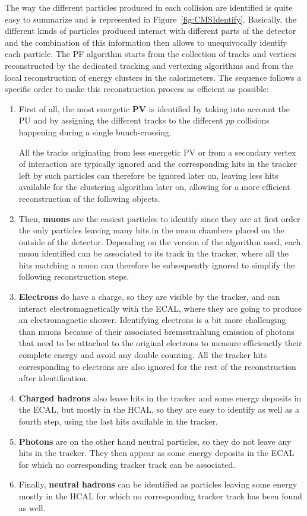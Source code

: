 \documentclass[a4paper, 10pt, openright]{report}
\begin{document}
The way the different particles produced in each collision are identified is quite easy to summarize and is represented in Figure~\ref{fig:CMSIdentify}. Basically, the different kinds of particles produced interact with different parts of the detector and the combination of this information then allows to unequivocally identify each particle. The \ac{PF} algorithm starts from the collection of tracks and vertices reconstructed by the dedicated tracking and vertexing algorithms and from the local reconstruction of energy clusters in the calorimeters. The sequence follows a specific order to make this reconstruction process as efficient as possible:

\begin{enumerate}
\item First of all, the most energetic \textbf{\acf{PV}} is identified by taking into account the \ac{PU} and by assigning the different tracks to the different $pp$ collisions happening during a single bunch-crossing. 

All the tracks originating from less energetic \ac{PV} or from a secondary vertex of interaction are typically ignored and the corresponding hits in the tracker left by such particles can therefore be ignored later on, leaving less hits available for the clustering algorithm later on, allowing for a more efficient reconstruction of the following objects.
\item Then, \textbf{muons} are the easiest particles to identify since they are at first order the only particles leaving many hits in the muon chambers placed on the outside of the detector. Depending on the version of the algorithm used, each muon identified can be associated to its track in the tracker, where all the hits matching a muon can therefore be subsequently ignored to simplify the following reconstruction steps.
\item \textbf{Electrons} do have a charge, so they are visible by the tracker, and can interact electromagnetically with the \ac{ECAL}, where they are going to produce an electromagnetic shower. Identifying electrons is a bit more challenging than muons because of their associated bremsstrahlung emission of photons that need to be attached to the original electrons to measure efficienctly their complete energy and avoid any double counting. All the tracker hits corresponding to electrons are also ignored for the rest of the reconstruction after identification.
\item \textbf{Charged hadrons} also leave hits in the tracker and some energy deposits in the \ac{ECAL}, but mostly in the \ac{HCAL}, so they are easy to identify as well as a fourth step, using the last hits available in the tracker.
\item \textbf{Photons} are on the other hand neutral particles, so they do not leave any hits in the tracker. They then appear as some energy deposits in the \ac{ECAL} for which no corresponding tracker track can be associated.
\item Finally, \textbf{neutral hadrons} can be identified as particles leaving some energy mostly in the \ac{HCAL} for which no corresponding tracker track has been found as well.
\end{enumerate}
\end{document}
